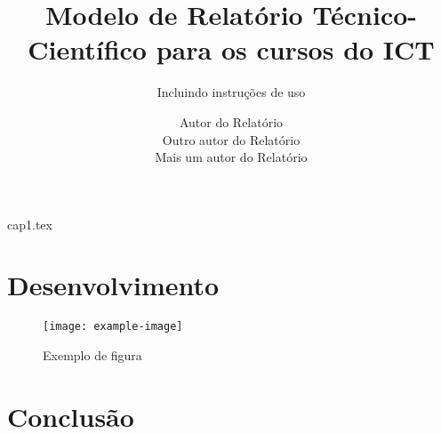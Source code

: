 \documentclass[12pt,a4paper,oneside]{book}
\title{Modelo de Relatório Técnico-Científico para os cursos do ICT}
\subtitle{Incluindo instruções de uso}
\author{Autor do Relatório\\Outro autor do Relatório\\Mais um autor do Relatório}
\begin{document}
\frontmatter


\maketitle

\makeabstracts


\listoffigures

\listoftables


\tableofcontents

\mainmatter

{cap1.tex}

\chapter{Desenvolvimento}\label{cap:desenvolvimento}
\lipsum[1-5]
\begin{figure}[!htb]
    \centering
    \caption{Exemplo de figura}
    \texttt{[image: example-image]}
    \label{fig:exemplo}
\end{figure}

\chapter{Conclusão}\label{cap:conclusao}
\lipsum[6-7]

\printbibliography
\end{document}
